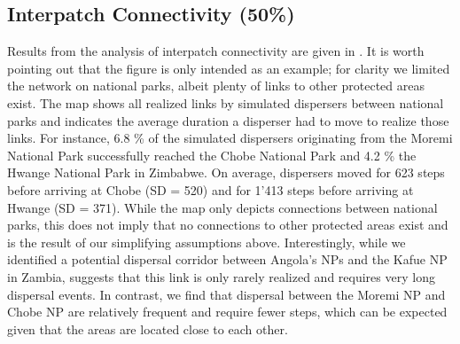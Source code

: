 \documentclass[abstract=on,10pt,a4paper,bibliography=totocnumbered]{article}
\begin{document}
\subsection{Interpatch Connectivity (50\%)}
Results from the analysis of interpatch connectivity are given in
. It is worth pointing out that the figure is only intended
as an example; for clarity we limited the network on national parks, albeit
plenty of links to other protected areas exist. The map shows all realized links
by simulated dispersers between national parks and indicates the average
duration a disperser had to move to realize those links. For instance, 6.8 \% of
the simulated dispersers originating from the Moremi National Park successfully
reached the Chobe National Park and 4.2 \% the Hwange National Park in Zimbabwe.
On average, dispersers moved for 623 steps before arriving at Chobe (SD = 520)
and for 1'413 steps before arriving at Hwange (SD = 371). While the map only
depicts connections between national parks, this does not imply that no
connections to other protected areas exist and is the result of our simplifying
assumptions above. Interestingly, while we identified a potential dispersal
corridor between Angola's NPs and the Kafue NP in Zambia, 
suggests that this link is only rarely realized and requires very long dispersal
events. In contrast, we find that dispersal between the Moremi NP and Chobe NP
are relatively frequent and require fewer steps, which can be expected given
that the areas are located close to each other.
\end{document}
